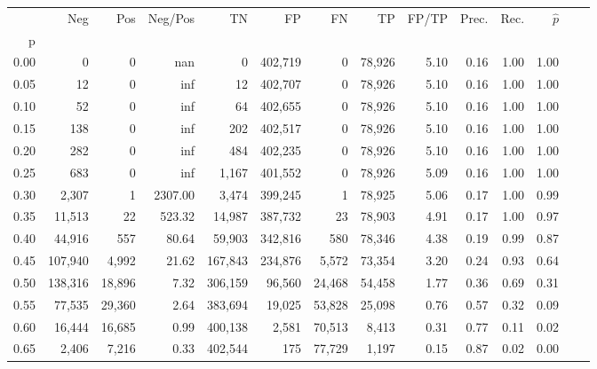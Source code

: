 \begin{tabular}{rrrrrrrrrrrrrr}
\toprule
{} &      Neg &     Pos &  Neg/Pos &       TN &       FP &      FN &      TP & FP/TP & Prec. &  Rec. & $\hat{p}$ \\
p    &          &         &          &          &          &         &         &       &       &       &           \\
\midrule
0.00 &        0 &       0 &      nan &        0 &  402,719 &       0 &  78,926 &  5.10 &  0.16 &  1.00 &      1.00 \\
0.05 &       12 &       0 &      inf &       12 &  402,707 &       0 &  78,926 &  5.10 &  0.16 &  1.00 &      1.00 \\
0.10 &       52 &       0 &      inf &       64 &  402,655 &       0 &  78,926 &  5.10 &  0.16 &  1.00 &      1.00 \\
0.15 &      138 &       0 &      inf &      202 &  402,517 &       0 &  78,926 &  5.10 &  0.16 &  1.00 &      1.00 \\
0.20 &      282 &       0 &      inf &      484 &  402,235 &       0 &  78,926 &  5.10 &  0.16 &  1.00 &      1.00 \\
0.25 &      683 &       0 &      inf &    1,167 &  401,552 &       0 &  78,926 &  5.09 &  0.16 &  1.00 &      1.00 \\
0.30 &    2,307 &       1 &  2307.00 &    3,474 &  399,245 &       1 &  78,925 &  5.06 &  0.17 &  1.00 &      0.99 \\
0.35 &   11,513 &      22 &   523.32 &   14,987 &  387,732 &      23 &  78,903 &  4.91 &  0.17 &  1.00 &      0.97 \\
0.40 &   44,916 &     557 &    80.64 &   59,903 &  342,816 &     580 &  78,346 &  4.38 &  0.19 &  0.99 &      0.87 \\
0.45 &  107,940 &   4,992 &    21.62 &  167,843 &  234,876 &   5,572 &  73,354 &  3.20 &  0.24 &  0.93 &      0.64 \\
0.50 &  138,316 &  18,896 &     7.32 &  306,159 &   96,560 &  24,468 &  54,458 &  1.77 &  0.36 &  0.69 &      0.31 \\
0.55 &   77,535 &  29,360 &     2.64 &  383,694 &   19,025 &  53,828 &  25,098 &  0.76 &  0.57 &  0.32 &      0.09 \\
0.60 &   16,444 &  16,685 &     0.99 &  400,138 &    2,581 &  70,513 &   8,413 &  0.31 &  0.77 &  0.11 &      0.02 \\
0.65 &    2,406 &   7,216 &     0.33 &  402,544 &      175 &  77,729 &   1,197 &  0.15 &  0.87 &  0.02 &      0.00 \\

\end{tabular}
